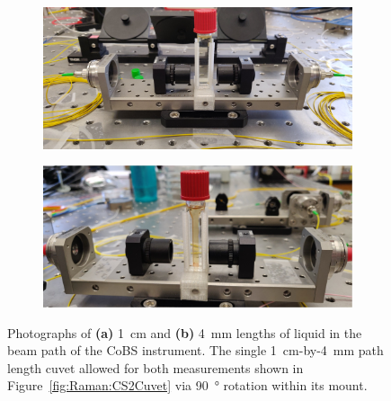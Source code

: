 \begin{figure}[t]
    \centering
    \begin{subfigure}[b]{0.49\textwidth}
        \centering
        \includegraphics[width=\textwidth]{figs/4-Raman/1cmCS2.jpeg}
        \caption{}
        \label{fig:Raman:1cmCS2pic}
    \end{subfigure}
    \hfill
    \begin{subfigure}[b]{0.49\textwidth}
        \centering
        \includegraphics[width=\textwidth]{figs/4-Raman/4mmCS2.jpg}
        \caption{}
        \label{fig:Raman:4mmCS2pic}
    \end{subfigure}
    \caption[Photographs of \SI{1}{\centi\meter} and \SI{4}{\milli\meter} lengths of liquid  in the beam path of the \ac{CoBS} instrument.]{Photographs of \textbf{(a)} \SI{1}{\centi\meter} and \textbf{(b)} \SI{4}{\milli\meter} lengths of liquid  in the beam path of the \ac{CoBS} instrument. The single \SI{1}{\centi\meter}-by-\SI{4}{\milli\meter} path length cuvet allowed for both measurements shown in Figure~\ref{fig:Raman:CS2Cuvet} via \SI{90}{\degree} rotation within its mount.}
    \label{fig:Raman:CS2Cuvetpics}
\end{figure}

